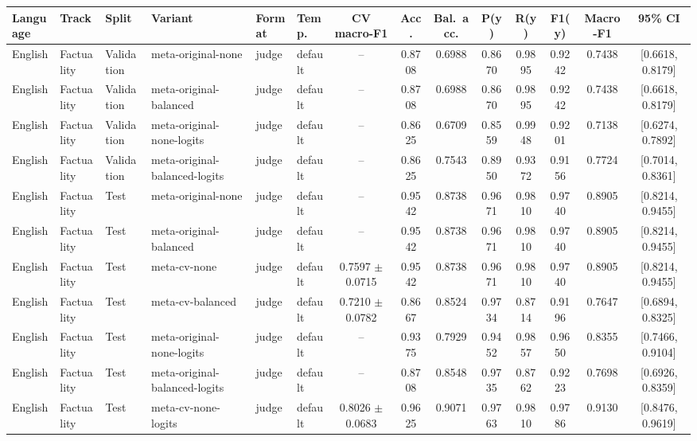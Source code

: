 \begin{tabular}{llllllcccccccc}
\hline
\textbf{Language} & \textbf{Track} & \textbf{Split} & \textbf{Variant} & \textbf{Format} & \textbf{Temp.} & \textbf{CV macro-F1} & \textbf{Acc.} & \textbf{Bal.\ acc.} & \textbf{P(y)} & \textbf{R(y)} & \textbf{F1(y)} & \textbf{Macro-F1} & \textbf{95\% CI} \\
\hline
English & Factuality & Validation & meta-original-none & judge & default & -- & 0.8708 & 0.6988 & 0.8670 & 0.9895 & 0.9242 & 0.7438 & [0.6618, 0.8179] \\
English & Factuality & Validation & meta-original-balanced & judge & default & -- & 0.8708 & 0.6988 & 0.8670 & 0.9895 & 0.9242 & 0.7438 & [0.6618, 0.8179] \\
English & Factuality & Validation & meta-original-none-logits & judge & default & -- & 0.8625 & 0.6709 & 0.8559 & 0.9948 & 0.9201 & 0.7138 & [0.6274, 0.7892] \\
English & Factuality & Validation & meta-original-balanced-logits & judge & default & -- & 0.8625 & 0.7543 & 0.8950 & 0.9372 & 0.9156 & 0.7724 & [0.7014, 0.8361] \\
English & Factuality & Test & meta-original-none & judge & default & -- & 0.9542 & 0.8738 & 0.9671 & 0.9810 & 0.9740 & 0.8905 & [0.8214, 0.9455] \\
English & Factuality & Test & meta-original-balanced & judge & default & -- & 0.9542 & 0.8738 & 0.9671 & 0.9810 & 0.9740 & 0.8905 & [0.8214, 0.9455] \\
English & Factuality & Test & meta-cv-none & judge & default & 0.7597 $\pm$ 0.0715 & 0.9542 & 0.8738 & 0.9671 & 0.9810 & 0.9740 & 0.8905 & [0.8214, 0.9455] \\
English & Factuality & Test & meta-cv-balanced & judge & default & 0.7210 $\pm$ 0.0782 & 0.8667 & 0.8524 & 0.9734 & 0.8714 & 0.9196 & 0.7647 & [0.6894, 0.8325] \\
English & Factuality & Test & meta-original-none-logits & judge & default & -- & 0.9375 & 0.7929 & 0.9452 & 0.9857 & 0.9650 & 0.8355 & [0.7466, 0.9104] \\
English & Factuality & Test & meta-original-balanced-logits & judge & default & -- & 0.8708 & 0.8548 & 0.9735 & 0.8762 & 0.9223 & 0.7698 & [0.6926, 0.8359] \\
English & Factuality & Test & meta-cv-none-logits & judge & default & 0.8026 $\pm$ 0.0683 & 0.9625 & 0.9071 & 0.9763 & 0.9810 & 0.9786 & 0.9130 & [0.8476, 0.9619] \\

\end{tabular}
